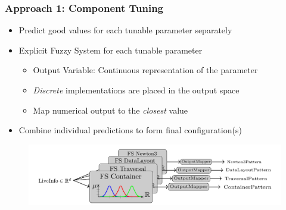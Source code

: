 \documentclass[
	10pt,
	t		%
]{beamer}
\begin{document}
\begin{frame}
	\frametitle{Approach 1: Component Tuning}
	\begin{itemize}
		\item Predict good values for each tunable parameter separately
		\item Explicit Fuzzy System for each tunable parameter
		      \begin{itemize}
			      \item Output Variable: Continuous representation of the parameter
			      \item \textit{Discrete} implementations are placed in the output space
			      \item Map numerical output to the \textit{closest} value\\
		      \end{itemize}
		\item Combine individual predictions to form final configuration(s)
	\end{itemize}
	
	\begin{figure}
		\centering
		\includegraphics[width=1\textwidth]{figures/component-approach.png}
	\end{figure}
	
\end{frame}
\end{document}

